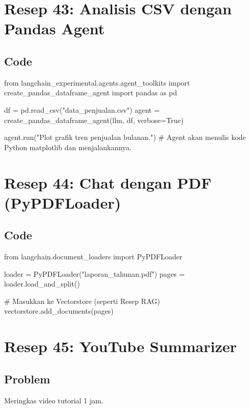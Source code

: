 \newpage

\section{Resep 43: Analisis CSV dengan Pandas Agent}

\subsection*{Code}
\begin{codeblock}[language=Python]
from langchain_experimental.agents.agent_toolkits import create_pandas_dataframe_agent
import pandas as pd

df = pd.read_csv("data_penjualan.csv")
agent = create_pandas_dataframe_agent(llm, df, verbose=True)

agent.run("Plot grafik tren penjualan bulanan.")
# Agent akan menulis kode Python matplotlib dan menjalankannya.
\end{codeblock}

\newpage

\section{Resep 44: Chat dengan PDF (PyPDFLoader)}

\subsection*{Code}
\begin{codeblock}[language=Python]
from langchain.document_loaders import PyPDFLoader

loader = PyPDFLoader("laporan_tahunan.pdf")
pages = loader.load_and_split()

# Masukkan ke Vectorstore (seperti Resep RAG)
vectorstore.add_documents(pages)
\end{codeblock}

\newpage

\section{Resep 45: YouTube Summarizer}

\subsection*{Problem}
Meringkas video tutorial 1 jam.

